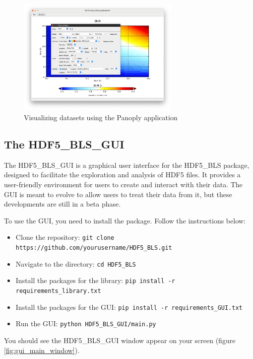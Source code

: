\documentclass{article}
\begin{document}
\begin{figure}[H]
    \centering
    \includegraphics[width=0.7\textwidth]{img/Panoply_viewer.png}
    \caption{Visualizing datasets using the Panoply application} 
    \label{fig:panoply_viewer}
\end{figure}

\subsection{The HDF5\_BLS\_GUI}

The HDF5\_BLS\_GUI is a graphical user interface for the HDF5\_BLS package, designed to facilitate the exploration and analysis of HDF5 files. It provides a user-friendly environment for users to create and interact with their data. The GUI is meant to evolve to allow users to treat their data from it, but these developments are still in a beta phase. 

To use the GUI, you need to install the package. Follow the instructions below:

\begin{itemize}
    \item Clone the repository: \texttt{git clone https://github.com/yourusername/HDF5\_BLS.git}
    \item Navigate to the directory: \texttt{cd HDF5\_BLS}
    \item Install the packages for the library: \texttt{pip install -r requirements\_library.txt}
    \item Install the packages for the GUI: \texttt{pip install -r requirements\_GUI.txt}
    \item Run the GUI: \texttt{python HDF5\_BLS\_GUI/main.py}
\end{itemize}

You should see the HDF5\_BLS\_GUI window appear on your screen (figure \ref{fig:gui_main_window}).
\end{document}
